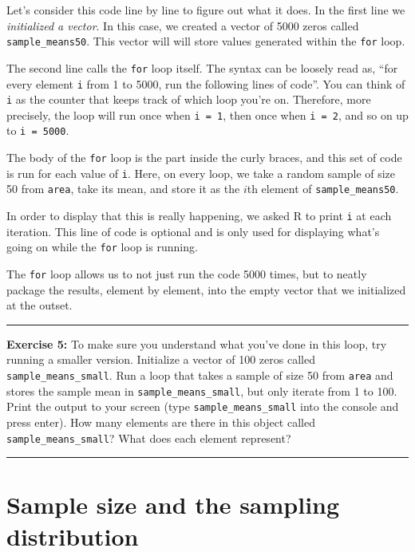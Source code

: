 \documentclass[]{book}
\theoremstyle{definition}
\theoremstyle{definition}
\theoremstyle{definition}
\theoremstyle{remark}
\begin{document}
Let's consider this code line by line to figure out what it does. In the
first line we \emph{initialized a vector}. In this case, we created a
vector of 5000 zeros called \texttt{sample\_means50}. This vector will
will store values generated within the \texttt{for} loop.

The second line calls the \texttt{for} loop itself. The syntax can be
loosely read as, ``for every element \texttt{i} from 1 to 5000, run the
following lines of code''. You can think of \texttt{i} as the counter
that keeps track of which loop you're on. Therefore, more precisely, the
loop will run once when \texttt{i\ =\ 1}, then once when
\texttt{i\ =\ 2}, and so on up to \texttt{i\ =\ 5000}.

The body of the \texttt{for} loop is the part inside the curly braces,
and this set of code is run for each value of \texttt{i}. Here, on every
loop, we take a random sample of size 50 from \texttt{area}, take its
mean, and store it as the \(i\)th element of \texttt{sample\_means50}.

In order to display that this is really happening, we asked R to print
\texttt{i} at each iteration. This line of code is optional and is only
used for displaying what's going on while the \texttt{for} loop is
running.

The \texttt{for} loop allows us to not just run the code 5000 times, but
to neatly package the results, element by element, into the empty vector
that we initialized at the outset.

\begin{center}\rule{0.5\linewidth}{\linethickness}\end{center}

\textbf{Exercise 5:} To make sure you understand what you've done in
this loop, try running a smaller version. Initialize a vector of 100
zeros called \texttt{sample\_means\_small}. Run a loop that takes a
sample of size 50 from \texttt{area} and stores the sample mean in
\texttt{sample\_means\_small}, but only iterate from 1 to 100. Print the
output to your screen (type \texttt{sample\_means\_small} into the
console and press enter). How many elements are there in this object
called \texttt{sample\_means\_small}? What does each element represent?

\begin{center}\rule{0.5\linewidth}{\linethickness}\end{center}

\section{Sample size and the sampling
distribution}\label{sample-size-and-the-sampling-distribution}
\end{document}

